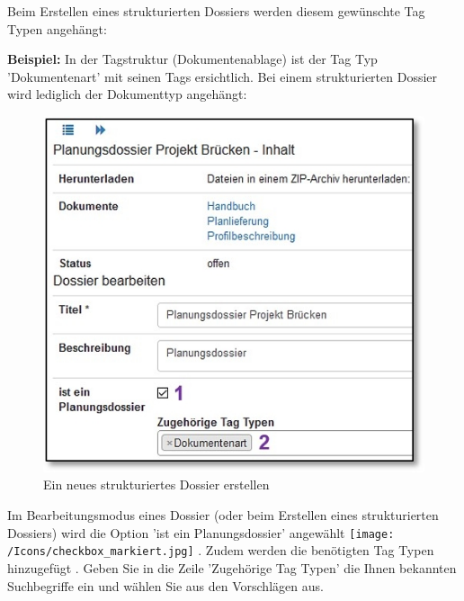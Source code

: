 Beim Erstellen eines strukturierten Dossiers werden diesem gewünschte Tag Typen angehängt:

\vspace{\baselineskip}

\textbf{Beispiel:} In der Tagstruktur (Dokumentenablage) ist der Tag Typ 'Dokumentenart' mit seinen Tags ersichtlich. Bei einem strukturierten Dossier wird lediglich der Dokumenttyp angehängt:

\vspace{.5cm}

\begin{figure}
  \vspace{-30pt}
  \begin{center}
    \includegraphics[width=1\linewidth]{../chapters/11_Dokumentenablage/pictures/plandos_Dossier.jpg}
  \end{center}
  \vspace{-20pt}
  \caption{Ein neues strukturiertes Dossier erstellen}
  \vspace{-10pt}
\end{figure}

Im Bearbeitungsmodus eines Dossier (oder beim Erstellen eines strukturierten Dossiers) wird die Option 'ist ein Planungsdossier' angewählt \texttt{[image: /Icons/checkbox\_markiert.jpg]} . Zudem werden die benötigten Tag Typen hinzugefügt . Geben Sie in die Zeile 'Zugehörige Tag Typen' die Ihnen bekannten Suchbegriffe ein und wählen Sie aus den Vorschlägen aus.

